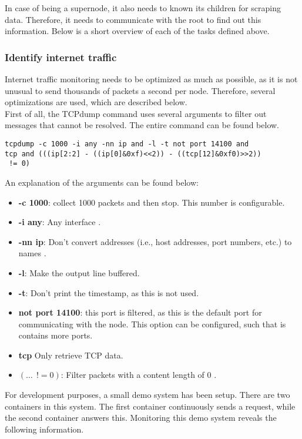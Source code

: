 \noindent
In case of being a supernode, it also needs to known its children for scraping data. Therefore, it needs to communicate with the root to find out this information. Below is a short overview of each of the tasks defined above.

\subsubsection{Identify internet traffic} \label{sec:identify-traffic}
Internet traffic monitoring needs to be optimized as much as possible, as it is not unusual to send thousands of packets a second per node. Therefore, several optimizations are used, which are described below.\\

\noindent
First of all, the TCPdump command uses several arguments to filter out messages that cannot be resolved. The entire command can be found below.
\begin{verbatim}
tcpdump -c 1000 -i any -nn ip and -l -t not port 14100 and
tcp and (((ip[2:2] - ((ip[0]&0xf)<<2)) - ((tcp[12]&0xf0)>>2))
 != 0)
\end{verbatim}
An explanation of the arguments can be found below:
\begin{itemize}
    \item \textbf{-c 1000}: collect 1000 packets and then stop. This number is configurable.
    \item \textbf{-i any}: Any interface \cite{tcpmanpage}.
    \item \textbf{-nn ip}: Don't convert addresses (i.e., host addresses, port numbers, etc.) to names \cite{tcpmanpage}.
    \item \textbf{-l}: Make the output line buffered.
    \item \textbf{-t}: Don't print the timestamp, as this is not used.
    \item \textbf{not port 14100}: this port is filtered, as this is the default port for communicating with the node. This option can be configured, such that is contains more ports.
    \item \textbf{tcp} Only retrieve TCP data.
    \item \textbf{$(\dots~~!= 0)$}: Filter packets with a content length of $0$ \cite{tcpdump-filter}.
\end{itemize}
For development purposes, a small demo system has been setup. There are two containers in this system. The first container continuously sends a request, while the second container answers this. Monitoring this demo system reveals the following information.
